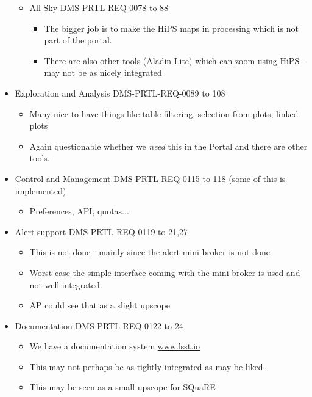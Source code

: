\begin{itemize}
\begin{itemize}
\item All Sky  DMS-PRTL-REQ-0078 to 88
\begin{itemize}
\item The bigger job is to make the HiPS maps in  processing which is not part of the portal.
\item There are also other tools (Aladin Lite) which can zoom using HiPS - may not be as nicely integrated
\end{itemize}

\end{itemize}

\item Exploration and Analysis DMS-PRTL-REQ-0089 to 108
\begin{itemize}
\item Many nice to have things like table filtering, selection from plots, linked plots
\item Again questionable whether we \emph{need} this in the Portal and there are other tools.
\end{itemize}

\item Control and Management DMS-PRTL-REQ-0115 to 118 (some of this is implemented)
\begin{itemize}
\item Preferences, API, quotas...
\end{itemize}
\item Alert support DMS-PRTL-REQ-0119 to 21,27
\begin{itemize}
\item This is not done - mainly since the alert mini broker is not done
\item Worst case the simple interface coming with the mini broker is used and not well integrated.
\item AP could see that as a slight upscope
\end{itemize}

\item Documentation DMS-PRTL-REQ-0122 to 24
\begin{itemize}
\item  We have a documentation system \url{www.lsst.io}
\item This may not perhaps be  as tightly integrated as may be liked.
\item This may be seen as a small upscope for SQuaRE
\end{itemize}
\end{itemize}

